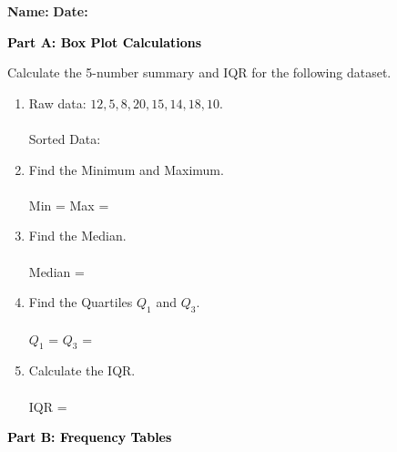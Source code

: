 \documentclass[12pt, letterpaper, fleqn]{article}
\newcommand{\blanklong}{\underline{\hspace{6.5cm}}}
\newcommand{\blankshorter}{\underline{\hspace{1.5cm}}}
\begin{document}
\textbf{Name:} \underline{\hspace{5cm}}
\hfill
\textbf{Date:} \underline{\hspace{3cm}}\\

\begin{tcolorbox}[colback=black!10]
    \large\textcolor{black}{\textbf{Part A: Box Plot Calculations}}
\end{tcolorbox}

\vspace{3mm}

\noindent
Calculate the 5-number summary and IQR for the following dataset.

\vspace{5mm}

\begin{enumerate}[itemsep=1.5cm, leftmargin=0.6cm]
\item Raw data: $12, 5, 8, 20, 15, 14, 18, 10$. \\ \\
Sorted Data: \blanklong
\vspace{0.5cm}

\item Find the Minimum and Maximum. \\ \\
Min = \blankshorter \quad Max = \blankshorter

\item Find the Median. \\ \\
Median = \blankshorter

\item Find the Quartiles $Q_1$ and $Q_3$. \\ \\
$Q_1$ = \blankshorter \quad $Q_3$ = \blankshorter

\item Calculate the IQR. \\ \\
IQR = \blankshorter
\end{enumerate}

\newpage

\begin{tcolorbox}[colback=black!10]
    \large\textcolor{black}{\textbf{Part B: Frequency Tables}}
\end{tcolorbox}
\end{document}
